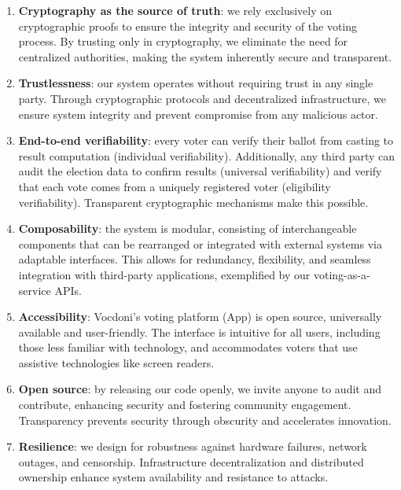 \begin{enumerate}
	\item \textbf{Cryptography as the source of truth}: we rely exclusively on cryptographic proofs to ensure the integrity and security of the voting process. By trusting only in cryptography, we eliminate the need for centralized authorities, making the system inherently secure and transparent.
	
	\item \textbf{Trustlessness}: our system operates without requiring trust in any single party. Through cryptographic protocols and decentralized infrastructure, we ensure system integrity and prevent compromise from any malicious actor.
	
	\item \textbf{End-to-end verifiability}: every voter can verify their ballot from casting to result computation (individual verifiability). Additionally, any third party can audit the election data to confirm results (universal verifiability) and verify that each vote comes from a uniquely registered voter (eligibility verifiability). Transparent cryptographic mechanisms make this possible.
	
	\item \textbf{Composability}: the system is modular, consisting of interchangeable components that can be rearranged or integrated with external systems via adaptable interfaces. This allows for redundancy, flexibility, and seamless integration with third-party applications, exemplified by our voting-as-a-service APIs.
	
	\item \textbf{Accessibility}: Vocdoni’s voting platform (App) is open source, universally available and user-friendly. The interface is intuitive for all users, including those less familiar with technology, and accommodates voters that use assistive technologies like screen readers.
	
	\item \textbf{Open source}: by releasing our code openly, we invite anyone to audit and contribute, enhancing security and fostering community engagement. Transparency prevents security through obscurity and accelerates innovation.
	
	\item \textbf{Resilience}: we design for robustness against hardware failures, network outages, and censorship. Infrastructure decentralization and distributed ownership enhance system availability and resistance to attacks.
	

\end{enumerate}
